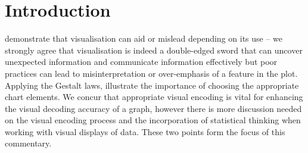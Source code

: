 \documentclass[ijds,nonblindrev]{informs-ijds}
\begin{document}
%


\section{Introduction}

\citet{basole2021} demonstrate that visualisation can aid or mislead depending on its use -- we strongly agree that visualisation is indeed a double-edged sword that can uncover unexpected information and communicate information effectively but poor practices can lead to misinterpretation or over-emphasis of a feature in the plot. Applying the Gestalt laws, \citet{basole2021} illustrate the importance of choosing the appropriate chart elements. We concur that appropriate visual encoding is vital for enhancing the visual decoding accuracy of a graph, however there is more discussion needed on the visual encoding process and the incorporation of statistical thinking when working with visual displays of data. These two points form the focus of this commentary. %
\end{document}
